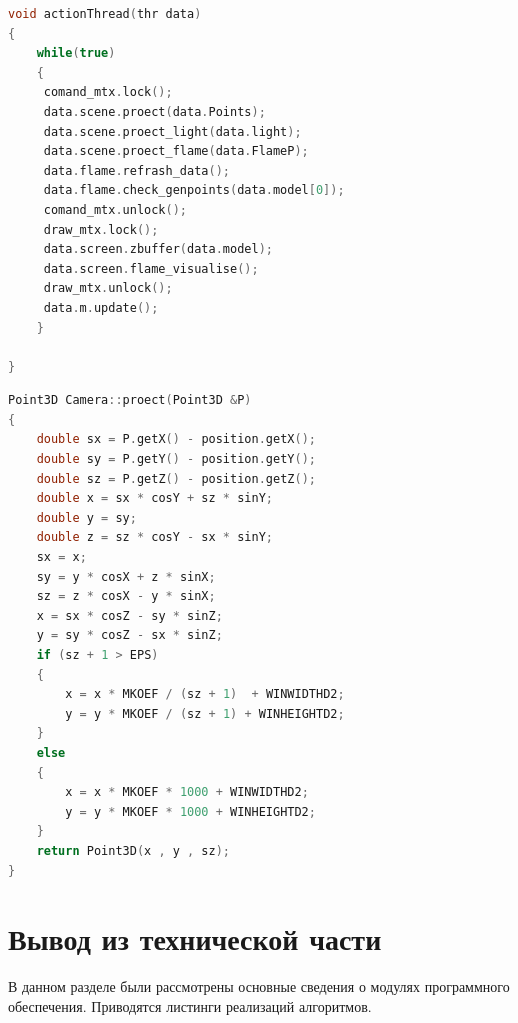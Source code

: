 \documentclass[a4paper,14pt]{report}
\begin{document}
\newpage
\begin{center}
\captionsetup{justification=raggedright,singlelinecheck=off}
\begin{lstlisting}[language=C++,
                   directivestyle={\color{black}}
                   emph={int,char,double,float,unsigned},
                   emphstyle={\color{blue}},label=brute,caption = Цикл работы] 
void actionThread(thr data)
{
    while(true)
    {
     comand_mtx.lock();
     data.scene.proect(data.Points);
     data.scene.proect_light(data.light);
     data.scene.proect_flame(data.FlameP);
     data.flame.refrash_data();
     data.flame.check_genpoints(data.model[0]);
     comand_mtx.unlock();
     draw_mtx.lock();
     data.screen.zbuffer(data.model);
     data.screen.flame_visualise();
     draw_mtx.unlock();
     data.m.update();
    }

}
\end{lstlisting}
\end{center}
\newpage
\begin{center}
\captionsetup{justification=raggedright,singlelinecheck=off}
\begin{lstlisting}[language=C++,
                   directivestyle={\color{black}}
                   emph={int,char,double,float,unsigned},
                   emphstyle={\color{blue}},label=brute,caption = Функция перевода точки в экранный координаты] 
Point3D Camera::proect(Point3D &P)
{
    double sx = P.getX() - position.getX();
    double sy = P.getY() - position.getY();
    double sz = P.getZ() - position.getZ();
    double x = sx * cosY + sz * sinY;
    double y = sy;
    double z = sz * cosY - sx * sinY;
    sx = x;
    sy = y * cosX + z * sinX;
    sz = z * cosX - y * sinX;
    x = sx * cosZ - sy * sinZ;
    y = sy * cosZ - sx * sinZ;
    if (sz + 1 > EPS)
    {
        x = x * MKOEF / (sz + 1)  + WINWIDTHD2;
        y = y * MKOEF / (sz + 1) + WINHEIGHTD2;
    }
    else
    {
        x = x * MKOEF * 1000 + WINWIDTHD2;
        y = y * MKOEF * 1000 + WINHEIGHTD2;
    }
    return Point3D(x , y , sz);
}
\end{lstlisting}
\end{center}
\section*{Вывод из технической части}
В данном разделе были рассмотрены основные сведения о модулях программного обеспечения. Приводятся листинги реализаций алгоритмов. 
\end{document}
